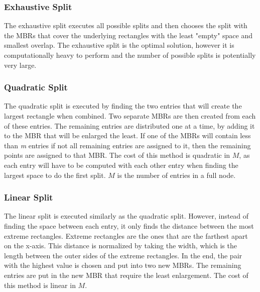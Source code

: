 \subsubsection{Exhaustive Split}
The exhaustive split executes all possible splits and then chooses the split with the MBRs that cover the underlying rectangles with the least "empty" space and smallest overlap. The exhaustive split is the optimal solution, however it is computationally heavy to perform and the number of possible splits is potentially very large.

\subsubsection{Quadratic Split}
The quadratic split is executed by finding the two entries that will create the largest rectangle when combined. Two separate MBRs are then created from each of these entries. The remaining entries are distributed one at a time, by adding it to the MBR that will be enlarged the least. If one of the MBRs will contain less than \emph{m} entries if not all remaining entries are assigned to it, then the remaining points are assigned to that MBR. The cost of this method is quadratic in $M$, as each entry will have to be computed with each other entry when finding the largest space to do the first split. $M$ is the number of entries in a full node. 

\subsubsection{Linear Split}
The linear split is executed similarly as the quadratic split. However, instead of finding the space between each entry, it only finds the distance between the most extreme rectangles. Extreme rectangles are the ones that are the farthest apart on the x-axis. This distance is normalized by taking the width, which is the length between the outer sides of the extreme rectangles. In the end, the pair with the highest value is chosen and put into two new MBRs. The remaining entries are put in the new MBR that require the least enlargement. The cost of this method is linear in $M$. 

